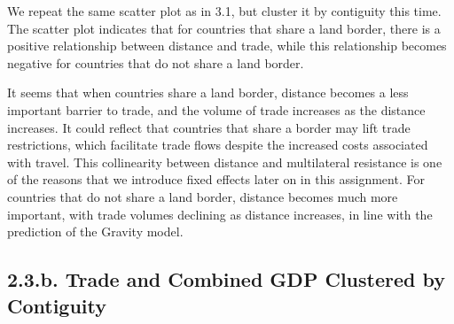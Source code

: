 \documentclass[
]{article}
\begin{document}
We repeat the same scatter plot as in 3.1, but cluster it by contiguity
this time. The scatter plot indicates that for countries that share a
land border, there is a positive relationship between distance and
trade, while this relationship becomes negative for countries that do
not share a land border.

It seems that when countries share a land border, distance becomes a
less important barrier to trade, and the volume of trade increases as
the distance increases. It could reflect that countries that share a
border may lift trade restrictions, which facilitate trade flows despite
the increased costs associated with travel. This collinearity between
distance and multilateral resistance is one of the reasons that we
introduce fixed effects later on in this assignment. For countries that
do not share a land border, distance becomes much more important, with
trade volumes declining as distance increases, in line with the
prediction of the Gravity model.

\hypertarget{b.-trade-and-combined-gdp-clustered-by-contiguity}{%
\subsection{2.3.b. Trade and Combined GDP Clustered by
Contiguity}\label{b.-trade-and-combined-gdp-clustered-by-contiguity}}
\end{document}
